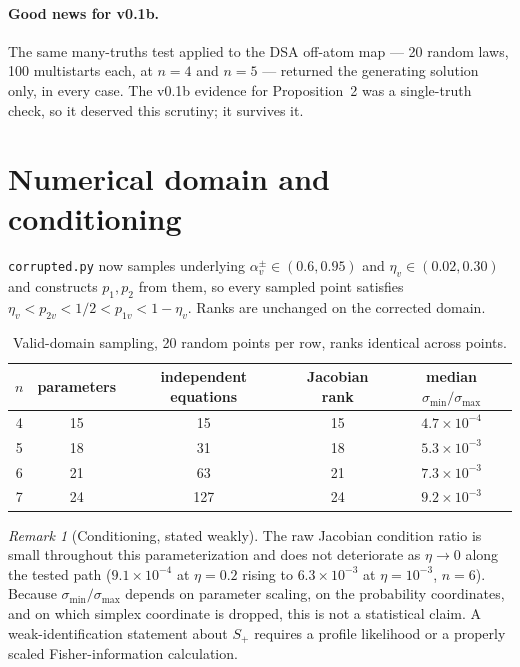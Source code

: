 \documentclass[11pt]{article}
\theoremstyle{remark}
\newtheorem*{remark}{Remark}
\begin{document}
\paragraph{Good news for v0.1b.} The same many-truths test applied to the DSA off-atom map --- 20 random laws, 100 multistarts each, at $n=4$ and $n=5$ --- returned the generating solution only, in every case. The v0.1b evidence for Proposition~2 was a single-truth check, so it deserved this scrutiny; it survives it.

\section*{Numerical domain and conditioning}

\texttt{corrupted.py} now samples underlying $\alpha_v^{\pm}\in(0.6,0.95)$ and $\eta_v\in(0.02,0.30)$ and constructs $p_1,p_2$ from them, so every sampled point satisfies $\eta_v<p_{2v}<1/2<p_{1v}<1-\eta_v$. Ranks are unchanged on the corrected domain.

\begin{table}[h]
\centering\small
\begin{tabular}{@{}ccccc@{}}
\toprule
$n$ & parameters & independent equations & Jacobian rank & median $\sigma_{\min}/\sigma_{\max}$\\
\midrule
4 & 15 & 15 & 15 & $4.7\times10^{-4}$\\
5 & 18 & 31 & 18 & $5.3\times10^{-3}$\\
6 & 21 & 63 & 21 & $7.3\times10^{-3}$\\
7 & 24 & 127 & 24 & $9.2\times10^{-3}$\\
\bottomrule
\end{tabular}
\caption{Valid-domain sampling, 20 random points per row, ranks identical across points.}
\end{table}

\begin{remark}[Conditioning, stated weakly]
The raw Jacobian condition ratio is small throughout this parameterization and does not deteriorate as $\eta\to0$ along the tested path ($9.1\times10^{-4}$ at $\eta=0.2$ rising to $6.3\times10^{-3}$ at $\eta=10^{-3}$, $n=6$). Because $\sigma_{\min}/\sigma_{\max}$ depends on parameter scaling, on the probability coordinates, and on which simplex coordinate is dropped, this is not a statistical claim. A weak-identification statement about $S_+$ requires a profile likelihood or a properly scaled Fisher-information calculation.
\end{remark}
\end{document}
